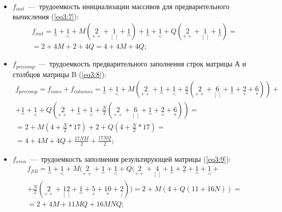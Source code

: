 \begin{itemize}
	\item $f_{init}$~---~трудоемкость инициализации массивов для предварительного вычисления (\ref{eq3:7}):
	\begin{multline}
		\label{eq3:7}
		f_{init} = {\underset{=}{1}} + {\underset{<}{1}} + M({\underset{++}{2}} + {\underset{[\ ]}{1}} + {\underset{=}{1}}) + {\underset{=}{1}} + {\underset{<}{1}} + Q({\underset{++}{2}} + {\underset{[\ ]}{1}} + {\underset{=}{1}}) = \\
		= 2 + 4M + 2 + 4Q = 4 + 4M + 4Q; 
	\end{multline}
	
	
	\item $f_{precomp}$~---~трудоемкость предварительного заполнения строк матрицы А и столбцов матрицы B (\ref{eq3:8}):
	\begin{multline}
		\label{eq3:8}
		f_{precomp} = f_{rows} + f_{columns} = {\underset{=}{1}} + {\underset{<}{1}} + M({\underset{++}{2}} + {\underset{=}{1}} + {\underset{<}{1}} + \frac{n}{2}({\underset{++}{2}} + {\underset{[\ ]}{6}} + {\underset{=}{1}} + {\underset{+}{2}} + {\underset{*}{6}})) + \\
		+ {\underset{=}{1}} + {\underset{<}{1}} + Q({\underset{++}{2}} + {\underset{=}{1}} + {\underset{<}{1}} + \frac{N}{2}({\underset{++}{2}} + {\underset{[\ ]}{6}} + {\underset{=}{1}} + {\underset{+}{2}} + {\underset{*}{6}})) = \\
		= 2 + M(4 + \frac{N}{2} * 17) + 2 + Q(4 + \frac{N}{2} * 17) = \\
		= 4 + 4M + 4Q + \frac{17NM}{2} + \frac{17NQ}{2};
	\end{multline}
	
	
	\item $f_{even}$~---~трудоемкость заполнения результирующей матрицы (\ref{eq3:9}):
	\begin{multline}
		\label{eq3:9}
		f_{fill} = {\underset{=}{1}} + {\underset{<}{1}} + M({\underset{++}{2}} + {\underset{=}{1}} + {\underset{<}{1}} + Q({\underset{++}{2}} + {\underset{[\ ]}{4}} + {\underset{=}{1}} + {\underset{-}{2}} + {\underset{=}{1}} + {\underset{<}{1}} +\\
		+ \frac{N}{2}({\underset{++}{2}} + {\underset{[\ ]}{12}} + {\underset{=}{1}} +
		{\underset{+}{5}} + {\underset{*}{10}} + {\underset{/}{2}})) = 2 + M(4 + Q(11 + 16N)) = \\
		= 2 + 4M + 11MQ + 16MNQ;
	\end{multline}
	

\end{itemize}
